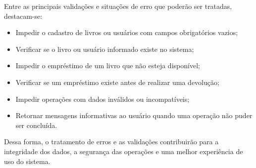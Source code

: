 \documentclass[12pt,a4paper]{article}
\begin{document}
Entre as principais validações e situações de erro que poderão ser tratadas, destacam-se:

\begin{itemize}
    \item Impedir o cadastro de livros ou usuários com campos obrigatórios vazios;
    \item Verificar se o livro ou usuário informado existe no sistema;
    \item Impedir o empréstimo de um livro que não esteja disponível;
    \item Verificar se um empréstimo existe antes de realizar uma devolução;
    \item Impedir operações com dados inválidos ou incompatíveis;
    \item Retornar mensagens informativas ao usuário quando uma operação não puder ser concluída.
\end{itemize}

Dessa forma, o tratamento de erros e as validações contribuirão para a integridade dos dados, a segurança das operações e uma melhor experiência de uso do sistema.
\end{document}
